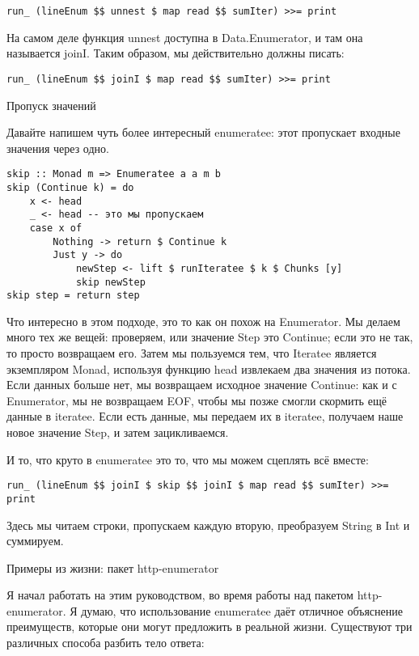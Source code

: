 \begin{lstlisting}
run_ (lineEnum $$ unnest $ map read $$ sumIter) >>= print
\end{lstlisting}

На самом деле функция unnest доступна в Data.Enumerator, и там она называется joinI. Таким образом, мы действительно должны писать:

\begin{lstlisting}
run_ (lineEnum $$ joinI $ map read $$ sumIter) >>= print
\end{lstlisting}

Пропуск значений

Давайте напишем чуть более интересный enumeratee: этот пропускает входные значения через одно.

\begin{lstlisting}
skip :: Monad m => Enumeratee a a m b
skip (Continue k) = do
    x <- head
    _ <- head -- это мы пропускаем
    case x of
        Nothing -> return $ Continue k
        Just y -> do
            newStep <- lift $ runIteratee $ k $ Chunks [y]
            skip newStep
skip step = return step
\end{lstlisting}

Что интересно в этом подходе, это то как он похож на Enumerator. Мы делаем много тех же вещей: проверяем, или значение Step это Continue; если это не так, то просто возвращаем его. Затем мы пользуемся тем, что Iteratee является экземпляром Monad, используя функцию head извлекаем два значения из потока. Если данных больше нет, мы возвращаем исходное значение Continue: как и с Enumerator, мы не возвращаем EOF, чтобы мы позже смогли скормить ещё данные в iteratee. Если есть данные, мы передаем их в iteratee, получаем наше новое значение Step, и затем зацикливаемся.

И то, что круто в enumeratee это то, что мы можем сцеплять всё вместе:

\begin{lstlisting}
run_ (lineEnum $$ joinI $ skip $$ joinI $ map read $$ sumIter) >>= print
\end{lstlisting}

Здесь мы читаем строки, пропускаем каждую вторую, преобразуем String в Int и суммируем.

Примеры из жизни: пакет http-enumerator

Я начал работать на этим руководством, во время работы над пакетом http-enumerator. Я думаю, что использование enumeratee даёт отличное объяснение преимуществ, которые они могут предложить в реальной жизни. Существуют три различных способа разбить тело ответа:

